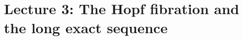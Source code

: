 \documentclass[10pt,oneside,leqno,openright]{memoir}
\begin{document}




\chapter*[The Hopf fibration and the LES]{Lecture 3: The Hopf fibration and the long exact sequence}


\end{document}
